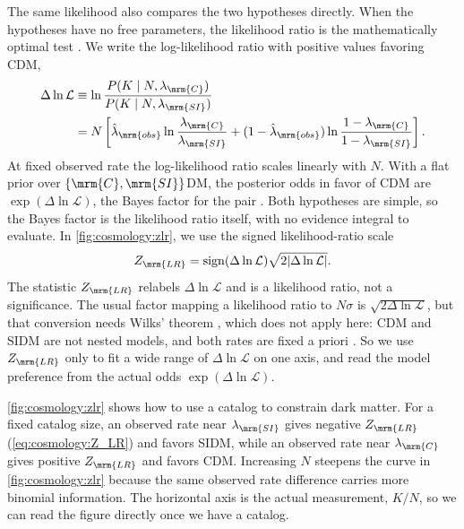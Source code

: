 \documentclass[linenumbers,twocolumn]{aastex701}
\newcommand{\lamC}{\ensuremath{\lambda_{\mrm{C}}}}    %
\newcommand{\lamSI}{\ensuremath{\lambda_{\mrm{SI}}}}  %
\newcommand{\lamObs}{\ensuremath{\hat{\lambda}_{\mrm{obs}}}}  %
\begin{document}
        The same likelihood also compares the two hypotheses directly. %
        When the hypotheses have no free parameters, the likelihood ratio is the mathematically optimal test \citep{Neyman+Pearson:1933:IXProblemMost}. %
        We write the log-likelihood ratio with positive values favoring \gls{CDM},
        \begin{align}\label{eq:cosmology:loglikelihood_ratio}
            \Delta\ln\mathcal{L}
            &\equiv
                \ln\frac{P(K\mid N,\lamC)}{P(K\mid N,\lamSI)} \\
            &=
                N\left[
                    \lamObs\ln\frac{\lamC}{\lamSI}
                    +
                    (1-\lamObs)\ln\frac{1-\lamC}{1-\lamSI}
                \right].  \nonumber %
        \end{align}
        At fixed observed rate the log-likelihood ratio scales linearly with $N$. %
        With a flat prior over $\{\mrm{C},\mrm{SI}\}$DM, the posterior odds in favor of \gls{CDM} are $\exp(\Delta\ln\mathcal{L})$, the Bayes factor for the pair \citep{Kass+Raftery:1995:BayesFactors,Trotta:2008:BayesSkyBayesian}. %
        Both hypotheses are simple, so the Bayes factor is the likelihood ratio itself, with no evidence integral to evaluate. %
        In \autoref{fig:cosmology:zlr}, we use the signed likelihood-ratio scale \citep{Cowan+:2011:AsymptoticFormulaeLikelihoodbased}
        \begin{equation}\label{eq:cosmology:Z_LR}
            Z_{\mrm{LR}}
            =
            \mathrm{sign}(\Delta\ln\mathcal{L})
            \sqrt{2|\Delta\ln\mathcal{L}|}. %
        \end{equation}
        The statistic $Z_{\mrm{LR}}$ relabels $\Delta\ln\mathcal{L}$ and is a likelihood ratio, not a significance. %
        The usual factor mapping a likelihood ratio to $N\sigma$ is $\sqrt{2\Delta\ln\mathcal{L}}$, but that conversion needs Wilks' theorem \citep{Wilks:1938:LargeSampleDistributionLikelihood}, which does not apply here: \gls{CDM} and \gls{SIDM} are not nested models, and both rates are fixed a priori \citep{Protassov+:2002:StatisticsHandleCare,Algeri+:2020:SearchingNewPhenomena}. %
        So we use $Z_{\mrm{LR}}$ only to fit a wide range of $\Delta\ln\mathcal{L}$ on one axis, and read the model preference from the actual odds $\exp(\Delta\ln\mathcal{L})$. %

        \autoref{fig:cosmology:zlr} shows how to use a catalog to constrain dark matter. %
        For a fixed catalog size, an observed rate near $\lamSI$ gives negative $Z_{\mrm{LR}}$ (\cref{eq:cosmology:Z_LR}) and favors \gls{SIDM}, while an observed rate near $\lamC$ gives positive $Z_{\mrm{LR}}$ and favors \gls{CDM}. %
        Increasing $N$ steepens the curve in \autoref{fig:cosmology:zlr} because the same observed rate difference carries more binomial information. %
        The horizontal axis is the actual measurement, $K/N$, so we can read the figure directly once we have a catalog. %
\end{document}
